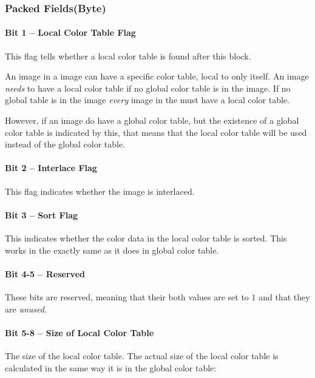 \begin{refsection}
  \subsubsection{Packed Fields(Byte)}

  \paragraph{Bit 1 -- Local Color Table Flag}

  This flag tells whether a local color table is found after this
  block. 

  An image in a \gif image can have a specific color table, local to
  only itself. An image \textit{needs} to have a local color table if
  no global color table is in the image. If no global table is in the
  image \textit{every} image in the \gif must have a local color
  table.

  However, if an image do have a global color table, but the existence
  of a global color table is indicated by this, that means that the
  local color table will be used instead of the global color table.

  \paragraph{Bit 2 -- Interlace Flag}

  This flag indicates whether the image is interlaced.

  \paragraph{Bit 3 -- Sort Flag}

  This indicates whether the color data in the local color table is
  sorted. This works in the exactly same as it does in global color
  table.

  \paragraph{Bit 4-5 -- Reserved}

  These bits are reserved, meaning that their both values are set to
  $1$ and that they are \textit{unused}.

  \paragraph{Bit 5-8 -- Size of Local Color Table}

  The size of the local color table. The actual size of the local
  color table is calculated in the same way it is in the global color
  table:


\end{refsection}
